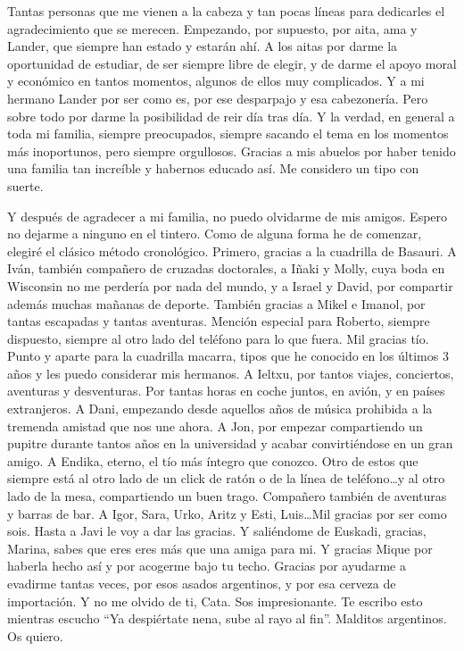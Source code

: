 
\begin{acknowledgementslong} 

Tantas personas que me vienen a la cabeza y tan pocas líneas para dedicarles
el agradecimiento que se merecen. Empezando, por supuesto, por aita, ama y Lander,
que siempre han estado y estarán ahí. A los aitas por darme la oportunidad de 
estudiar, de ser siempre libre de elegir, y de darme el apoyo moral y económico 
en tantos momentos, algunos de ellos muy complicados. Y a mi hermano Lander por 
ser como es, por ese desparpajo y esa cabezonería. Pero sobre todo por darme la 
posibilidad de reir día tras día. Y la verdad, en general a toda mi familia, 
siempre preocupados, siempre sacando el tema en los momentos más inoportunos, 
pero siempre orgullosos. Gracias a mis abuelos por haber tenido una familia tan 
increíble y habernos educado así. Me considero un tipo con suerte.

Y después de agradecer a mi familia, no puedo olvidarme de mis amigos. Espero
no dejarme a ninguno en el tintero. Como de alguna forma he de comenzar, elegiré 
el clásico método cronológico. Primero, gracias a la cuadrilla de Basauri. A Iván,
también compañero de cruzadas doctorales, a Iñaki y Molly, cuya boda en Wisconsin
no me perdería por nada del mundo, y a Israel y David, por compartir además muchas
mañanas de deporte. También gracias a Mikel e Imanol, por tantas escapadas y 
tantas aventuras. Mención especial para Roberto, siempre dispuesto, siempre al 
otro lado del teléfono para lo que fuera. Mil gracias tío. Punto y aparte para
la cuadrilla macarra, tipos que he conocido en los últimos 3 años y les puedo
considerar mis hermanos. A Ieltxu, por tantos viajes, conciertos, aventuras y 
desventuras. Por tantas horas en coche juntos, en avión, y en países extranjeros.
A Dani, empezando desde aquellos años de música prohibida a la tremenda 
amistad que nos une ahora. A Jon, por empezar compartiendo un pupitre durante 
tantos años en la universidad y acabar convirtiéndose en un gran amigo. A Endika, 
eterno, el tío más íntegro que conozco. Otro de estos que siempre está al otro lado
de un click de ratón o de la línea de teléfono\dots y al otro lado de la mesa,
compartiendo un buen trago. Compañero también de aventuras y barras de bar.
A Igor, Sara, Urko, Aritz y Esti, Luis\dots Mil gracias por ser como sois. Hasta
a Javi le voy a dar las gracias. Y saliéndome de Euskadi, gracias, Marina, sabes
que eres eres más que una amiga para mi. Y gracias Mique por haberla hecho así y
por acogerme bajo tu techo. Gracias por ayudarme a evadirme tantas veces, por
esos asados argentinos, y por esa cerveza de importación. Y no me olvido de ti,
Cata. Sos impresionante. Te escribo esto mientras escucho ``Ya despiértate nena,
sube al rayo al fin''. Malditos argentinos. Os quiero.


\end{acknowledgementslong}

